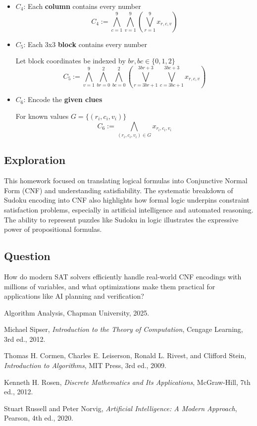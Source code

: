 \documentclass[11pt]{article}
\begin{document}
\begin{itemize}[leftmargin=*]
\begin{itemize}
    \item \( C_4 \): Each \textbf{column} contains every number
    \[
    C_4 := \bigwedge_{c=1}^{9} \bigwedge_{v=1}^{9} \left( \bigvee_{r=1}^{9} x_{r,c,v} \right)
    \]

    \item \( C_5 \): Each 3x3 \textbf{block} contains every number

    Let block coordinates be indexed by \( br, bc \in \{0,1,2\} \)
    \[
    C_5 := \bigwedge_{v=1}^{9} \bigwedge_{br=0}^{2} \bigwedge_{bc=0}^{2} \left( \bigvee_{r=3br+1}^{3br+3} \bigvee_{c=3bc+1}^{3bc+3} x_{r,c,v} \right)
    \]

    \item \( C_6 \): Encode the \textbf{given clues}

    For known values \( G = \{(r_i, c_i, v_i)\} \)
    \[
    C_6 := \bigwedge_{(r_i, c_i, v_i) \in G} x_{r_i,c_i,v_i}
    \]
\end{itemize}

\end{itemize}

\subsection{Exploration}

This homework focused on translating logical formulas into Conjunctive Normal Form (CNF) and understanding satisfiability. The systematic breakdown of Sudoku encoding into CNF also highlights how formal logic underpins constraint satisfaction problems, especially in artificial intelligence and automated reasoning. The ability to represent puzzles like Sudoku in logic illustrates the expressive power of propositional formulas.

\subsection{Question}

How do modern SAT solvers efficiently handle real-world CNF encodings with millions of variables, and what optimizations make them practical for applications like AI planning and verification?

\newpage
\begin{thebibliography}{9}

Algorithm Analysis, Chapman University, 2025.

Michael Sipser, \textit{Introduction to the Theory of Computation}, Cengage Learning, 3rd ed., 2012.

Thomas H. Cormen, Charles E. Leiserson, Ronald L. Rivest, and Clifford Stein, \textit{Introduction to Algorithms}, MIT Press, 3rd ed., 2009.

Kenneth H. Rosen, \textit{Discrete Mathematics and Its Applications}, McGraw-Hill, 7th ed., 2012.

Stuart Russell and Peter Norvig, \textit{Artificial Intelligence: A Modern Approach}, Pearson, 4th ed., 2020.

\end{thebibliography}
\end{document}
